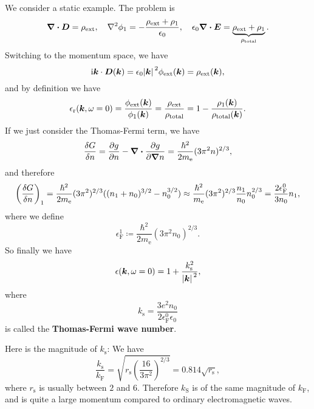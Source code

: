 \documentclass[hyperref, a4paper]{article}
\newcommand*{\ii}{\mathrm{i}}
\newcommand*{\concept}[1]{{\textbf{#1}}}
\begin{document}
We consider a static example. The problem is 
\begin{equation}
    \div{\vb*{D}} = \rho_\text{ext}, \quad \laplacian \phi_1 = - \frac{\rho_\text{ext} + \rho_1}{\epsilon_0}, \quad \epsilon_0 \div{\vb*{E}} = \underbrace{\rho_\text{ext} + \rho_1}_{\rho_\text{total}}. 
\end{equation}
Switching to the momentum space, we have 
\[
    \ii \vb*{k} \cdot \vb*{\vb*{D}}(\vb*{k}) = \epsilon_0 \abs*{\vb*{k}}^2 \phi_\text{ext}(\vb*{k}) = \rho_\text{ext}(\vb*{k}), 
\]
and by definition we have 
\begin{equation}
    \epsilon_\text{r}(\vb*{k}, \omega = 0) = \frac{\phi_\text{ext}(\vb*{k})}{\phi_1(\vb*{k})} = \frac{\rho_\text{ext}}{\rho_\text{total}} = 1 - \frac{\rho_1(\vb*{k})}{\rho_\text{total}(\vb*{k})}.
\end{equation}
If we just consider the Thomas-Fermi term, we have 
\[
    \fdv{G}{n} = \pdv{g}{n} - \div{\pdv{g}{\grad{n}} } = \frac{\hbar^2}{2m_\text{e}} (3\pi^2 n)^{2/3} ,
\]
and therefore 
\[
    \left(\fdv{G}{n}\right)_1 = \frac{\hbar^2}{2m_\text{e}} (3\pi^2 )^{2/3} ((n_1 + n_0)^{3/2} - n_0^{3/2}) \approx \frac{\hbar^2}{m_\text{e}} (3\pi^2)^{2/3} \frac{n_1}{n_0} n_0^{2/3} = \frac{2 \epsilon_\text{F}^0}{3 n_0} n_1,
\]
where we define
\begin{equation}
    \epsilon_\text{F}^1 \coloneqq \frac{\hbar^2}{2m_\text{e}} (3\pi^2 n_0)^{2/3}.
\end{equation}
So finally we have 
\begin{equation}
    \epsilon(\vb*{k}, \omega=0) = 1 + \frac{k_\text{s}^2}{\abs*{\vb*{k}}^2},
\end{equation}
where 
\begin{equation}
    k_\text{s} = \frac{3 e^2 n_0}{ 2 \epsilon_\text{F}^0 \epsilon_0} 
\end{equation}
is called the \concept{Thomas-Fermi wave number}.

Here is the magnitude of $k_\text{s}$: We have 
\begin{equation}
    \frac{k_\text{s}}{k_\text{F}} = \sqrt{r_\text{s} \left(\frac{16}{3\pi^2}\right)^{2/3}} = 0.814 \sqrt{r_\text{s}},
\end{equation}
where $r_\text{s}$ is usually between $2$ and $6$.
Therefore $k_\text{S}$ is of the same magnitude of $k_\text{F}$, and is quite a large momentum compared to ordinary electromagnetic waves.
\end{document}
